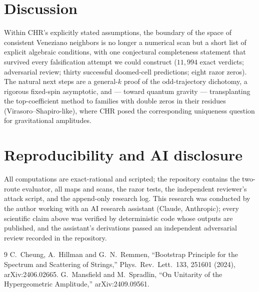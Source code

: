 \documentclass[11pt]{article}
\begin{document}
\section{Discussion}

Within CHR's explicitly stated assumptions, the boundary of the space of
consistent Veneziano neighbors is no longer a numerical scan but a short list
of explicit algebraic conditions, with one conjectural completeness statement
that survived every falsification attempt we could construct
($11{,}994$ exact verdicts; adversarial review; thirty successful
doomed-cell predictions; eight razor zeros). The natural next steps are a
general-$k$ proof of the odd-trajectory dichotomy, a rigorous fixed-spin
asymptotic, and --- toward quantum gravity --- transplanting the
top-coefficient method to families with double zeros in their residues
(Virasoro--Shapiro-like), where CHR posed the corresponding uniqueness
question for gravitational amplitudes.

\section*{Reproducibility and AI disclosure}

All computations are exact-rational and scripted; the repository contains the
two-route evaluator, all maps and scans, the razor tests, the independent
reviewer's attack script, and the append-only research log. This research was
conducted by the author working with an AI research assistant (Claude,
Anthropic); every scientific claim above was verified by deterministic code
whose outputs are published, and the assistant's derivations passed an
independent adversarial review recorded in the repository.

\begin{thebibliography}{9}
 C.~Cheung, A.~Hillman and G.~N.~Remmen,
``Bootstrap Principle for the Spectrum and Scattering of Strings,''
Phys.\ Rev.\ Lett.\ 133, 251601 (2024), arXiv:2406.02665.
 G.~Mansfield and M.~Spradlin,
``On Unitarity of the Hypergeometric Amplitude,''
arXiv:2409.09561.
\end{thebibliography}
\end{document}
